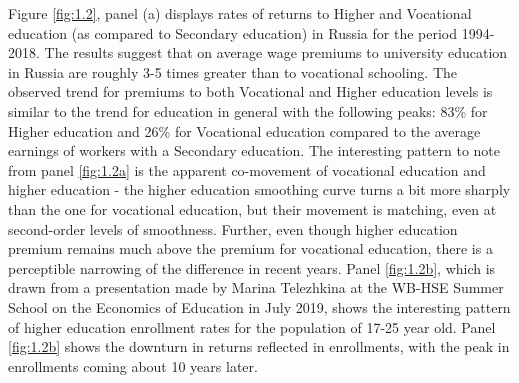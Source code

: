 \documentclass[12pt,a4paper]{article}
\numberwithin{equation}{section}
\begin{document}
Figure \ref{fig:1.2}, panel (a) displays rates of returns to Higher and Vocational education (as compared to Secondary education) in Russia for the period 1994-2018. The results suggest that on average wage premiums to university education in Russia are roughly 3-5 times greater than to vocational schooling. The observed trend for premiums to both Vocational and Higher education levels is similar to the trend for education in general with the following peaks: 83\% for Higher education and 26\% for Vocational education compared to the average earnings of workers with a Secondary education. The interesting pattern to note from panel \ref{fig:1.2a} is the apparent co-movement of vocational education and higher education - the higher education smoothing curve turns a bit more sharply than the one for vocational education, but their movement is matching, even at second-order levels of smoothness. Further, even though higher education premium remains much above the premium for vocational education, there is a perceptible narrowing of the difference in recent years. Panel \ref{fig:1.2b}, which is drawn from a presentation made by Marina Telezhkina at the WB-HSE Summer School on the Economics of Education in July 2019, shows the interesting pattern of higher education enrollment rates for the population of 17-25 year old. Panel \ref{fig:1.2b} shows the downturn in returns reflected in enrollments, with the peak in enrollments coming about 10 years later. 
\\
\end{document}
